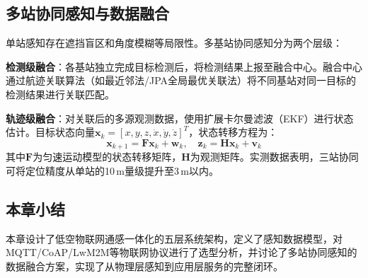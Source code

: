 \subsection{多站协同感知与数据融合}

单站感知存在遮挡盲区和角度模糊等局限性。多基站协同感知分为两个层级：

\textbf{检测级融合}：各基站独立完成目标检测后，将检测结果上报至融合中心。融合中心通过航迹关联算法（如最近邻法/JPA全局最优关联法）将不同基站对同一目标的检测结果进行关联匹配。

\textbf{轨迹级融合}：对关联后的多源观测数据，使用扩展卡尔曼滤波（EKF）进行状态估计。目标状态向量$\mathbf{x}_k = [x, y, z, \dot{x}, \dot{y}, \dot{z}]^T$，状态转移方程为：
\begin{equation}
  \mathbf{x}_{k+1} = \mathbf{F}\mathbf{x}_k + \mathbf{w}_k, \quad \mathbf{z}_k = \mathbf{H}\mathbf{x}_k + \mathbf{v}_k
\end{equation}
其中$\mathbf{F}$为匀速运动模型的状态转移矩阵，$\mathbf{H}$为观测矩阵。实测数据表明，三站协同可将定位精度从单站的10\,m量级提升至3\,m以内。

\subsection{本章小结}
本章设计了低空物联网通感一体化的五层系统架构，定义了感知数据模型，对MQTT/CoAP/LwM2M等物联网协议进行了选型分析，并讨论了多站协同感知的数据融合方案，实现了从物理层感知到应用层服务的完整闭环。

